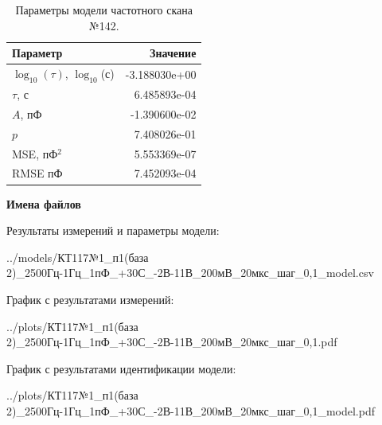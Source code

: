 \begin{table}[!ht]
    \centering
    \caption{Параметры модели частотного скана №142.}
    \begin{tabular}{|l|r|}
        \hline
        Параметр                                       & Значение                  \\ \hline
        $\log_{10}(\tau)$, $\log_{10}$(с)              & -3.188030e+00             \\ \hline
        $\tau$, с                                      & 6.485893e-04              \\ \hline
        $A$, пФ                                        & -1.390600e-02             \\ \hline
        $p$                                            & 7.408026e-01              \\ \hline
        MSE, пФ$^2$                                    & 5.553369e-07              \\ \hline
        RMSE пФ                                        & 7.452093e-04              \\ \hline
    \end{tabular}
    \label{table:frequency_scan_model_142}
\end{table}

\textbf{Имена файлов}

Результаты измерений и параметры модели:

\scriptsize../models/КТ117№1\_п1(база 2)\_2500Гц-1Гц\_1пФ\_+30С\_-2В-11В\_200мВ\_20мкс\_шаг\_0,1\_model.csv
\normalsize

График с результатами измерений:

\scriptsize../plots/КТ117№1\_п1(база 2)\_2500Гц-1Гц\_1пФ\_+30С\_-2В-11В\_200мВ\_20мкс\_шаг\_0,1.pdf
\normalsize

График с результатами идентификации модели:

\scriptsize../plots/КТ117№1\_п1(база 2)\_2500Гц-1Гц\_1пФ\_+30С\_-2В-11В\_200мВ\_20мкс\_шаг\_0,1\_model.pdf
\normalsize

